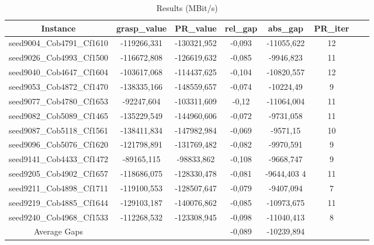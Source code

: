 \documentclass[a4paper]{article}
\begin{document}
\begin{center}
\begin{longtable}{cccccccc}
\caption{Results (MBit/s)  }
\tabularnewline
\hline
Instance & grasp\_value & PR\_value & rel\_gap & abs\_gap  & PR\_iter\\
\hline
seed9004\_Cob4791\_Cf1610 & -119266,331 & -130321,952 & -0,093 & -11055,622  & 12\\
\hline
seed9026\_Cob4993\_Cf1500 & -116672,808 & -126619,632 & -0,085 & -9946,823 & 11\\
\hline
seed9040\_Cob4647\_Cf1604 & -103617,068 & -114437,625 & -0,104 & -10820,557  & 12\\
\hline
seed9053\_Cob4872\_Cf1470 & -138335,166 & -148559,657 & -0,074 & -10224,49 & 9\\
\hline
seed9077\_Cob4780\_Cf1653 & -92247,604 & -103311,609 & -0,12 & -11064,004 &11\\
\hline
seed9082\_Cob5089\_Cf1465 & -135229,549 & -144960,606 & -0,072 & -9731,058 & 11\\
\hline
seed9087\_Cob5118\_Cf1561 & -138411,834 & -147982,984 & -0,069 & -9571,15  & 10\\
\hline
seed9096\_Cob5076\_Cf1620 & -121798,891 & -131769,482 & -0,082 & -9970,591  & 9\\
\hline
seed9141\_Cob4433\_Cf1472 & -89165,115 & -98833,862 & -0,108 & -9668,747 & 9\\
\hline
seed9205\_Cob4902\_Cf1657 & -118686,075 & -128330,478 & -0,081 & -9644,403 4 & 11\\
\hline
seed9211\_Cob4898\_Cf1711 & -119100,553 & -128507,647 & -0,079 & -9407,094  & 7\\
\hline
seed9219\_Cob4885\_Cf1644 & -129103,187 & -140076,862 & -0,085 & -10973,675  & 11\\
\hline
seed9240\_Cob4968\_Cf1533 & -112268,532 & -123308,945 & -0,098 & -11040,413  & 8\\
\hline
\hline
Average Gaps & & & -0,089 & -10239,894 & & \\
\hline
\hline
\end{longtable}
\end{center}
\end{document}
